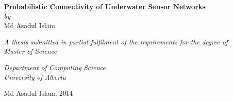 \documentclass[12pt, oneside]{Thesis} %
\begin{document}
\begin{titlepage}
\begin{center}


{\large \bfseries Probabilistic Connectivity of Underwater Sensor Networks}\\[0.4cm] %
\vspace{0.3 cm}
{\em by}\\
\vspace{0.5 cm}
{Md Asadul Islam}\\ %
\vspace{2 cm}
 
 \textit{A thesis submitted in partial fulfilment of the requirements for the degree of }\\[0.4cm] %
 {\em Master of Science}\\
 
 \vspace*{0.4 cm}
 
 
 {\em Department of Computing Science}\\
  \vspace*{0.4 cm}
 {\em University of Alberta}
 
\vfill
\textcopyright Md Asadul Islam, 2014
\end{center}

\end{titlepage}
\end{document}
